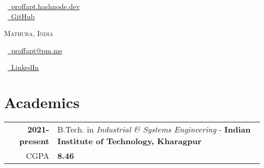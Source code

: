 \documentclass[a4paper,10pt]{extarticle} %
\begin{document}
\pagestyle{empty} %

\begin{multicols}{3}

\normalsize  \faGlobe\ {\href{https://proffapt.hashnode.dev/}{\  proffapt.hashnode.dev}}\\
\normalsize \faGithub\ {\href{https://github.com/proffapt}{\  GitHub}}\\
\columnbreak
\normalsize\par{\centering{\huge\textsc{\textcolor{primary}{Arpit Bhardwaj}}}\par} 
\par{\centering\normalsize {\textsc{Mathura, India}}\hfill\par}
\columnbreak
\raggedright\hfill\normalsize \faEnvelope\ {\href{mailto:proffapt@pm.me}{\  proffapt@pm.me}}\\
\raggedright\hfill\normalsize \faLinkedinSquare\ {\href{https://www.linkedin.com/in/proffapt}{\  LinkedIn}}\\
\end{multicols}
\vspace{-0.4 cm}

\section{\textcolor{primary}{Academics}}
\vspace{+0.1cm}

\begin{tabular}{r|p{17.5cm}}	

 \textbf{2021-present} & B.Tech. in \textit{Industrial \& Systems Engineering} - \textbf{Indian Institute of Technology, Kharagpur}\\
 \hfill CGPA & \textbf{8.46}\\

 
\end{tabular}
\end{document}
